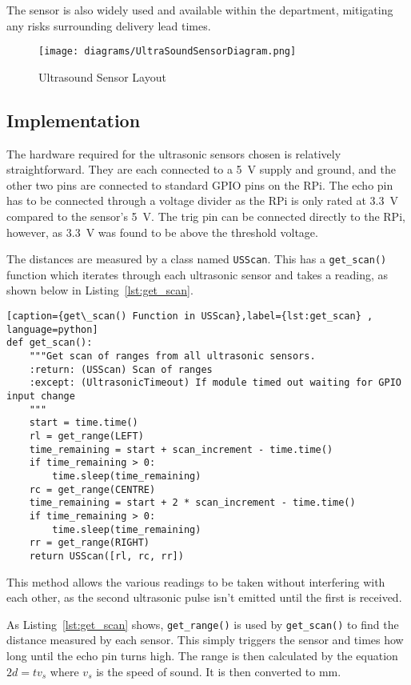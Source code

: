 The sensor is also widely used and available within the
department, mitigating any risks surrounding delivery lead times.

\begin{figure}[!ht]
	\centering
	\texttt{[image: diagrams/UltraSoundSensorDiagram.png]}
	\caption{Ultrasound Sensor Layout}\label{UltraSoundSensorDiagram}

\end{figure}

\subsection{Implementation}\label{elec/range/impl}
The hardware required for the ultrasonic sensors chosen is relatively straightforward.
They are each connected to a \SI{5}{\volt} supply and ground, and the other two pins are
connected to standard GPIO pins on the RPi. The echo pin has to be connected through
a voltage divider as the RPi is only rated at \SI{3.3}{\volt} compared to the sensor's \SI{5}{\volt}. The
trig pin can be connected directly to the RPi, however, as \SI{3.3}{\volt} was found to be above
the threshold voltage.

The distances are measured by a class named \verb|USScan|. This has a
\verb|get_scan()| function which iterates through each ultrasonic sensor and takes a reading,
as shown below in Listing~\ref{lst:get_scan}.

\begin{lstlisting}[caption={get\_scan() Function in USScan},label={lst:get_scan} , language=python]
def get_scan():
    """Get scan of ranges from all ultrasonic sensors.
    :return: (USScan) Scan of ranges
    :except: (UltrasonicTimeout) If module timed out waiting for GPIO input change
    """
    start = time.time()
    rl = get_range(LEFT)
    time_remaining = start + scan_increment - time.time()
    if time_remaining > 0:
        time.sleep(time_remaining)
    rc = get_range(CENTRE)
    time_remaining = start + 2 * scan_increment - time.time()
    if time_remaining > 0:
        time.sleep(time_remaining)
    rr = get_range(RIGHT)
    return USScan([rl, rc, rr])
\end{lstlisting}

This method allows the various readings to be taken without interfering with
each other, as the second ultrasonic pulse isn't emitted until the first is received.

As Listing~\ref{lst:get_scan} shows, \verb|get_range()| is used by
\verb|get_scan()| to find the distance measured by each sensor.
This simply triggers the sensor and times how long until the echo
pin turns high. The range is then calculated by the equation
$ 2d = tv_s$ where $v_s$ is the speed of sound. It is then converted
to \si{\mm}.

